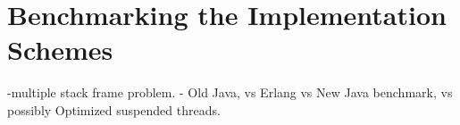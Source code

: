 \section{Benchmarking the Implementation Schemes}
\label{bench}
-multiple stack frame problem.
- Old Java, vs Erlang vs New Java benchmark, vs possibly Optimized suspended threads.



